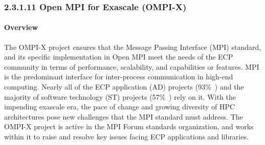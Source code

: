 \subsubsection{2.3.1.11 Open MPI for Exascale (OMPI-X)}\label{subsubsect:openmpi}



\paragraph{Overview}

The OMPI-X project ensures that the Message Passing Interface (MPI)
standard, and its specific implementation in Open MPI meet the needs
of the ECP community in terms of performance, scalability, and
capabilities or features. MPI is the predominant interface for
inter-process communication in high-end computing.  Nearly all of the
ECP application (AD) projects (93\%~\cite{Bernholdt:2017:smu-talk})
and the majority of software technology (ST) projects
(57\%~\cite{Bernholdt:2017:smu-talk}) rely on it.
With the impending exascale era, the
pace of change and growing diversity of HPC architectures pose new
challenges that the MPI standard must address.  The OMPI-X project is
active in the MPI Forum standards organization, and works within it to
raise and resolve key issues facing ECP applications and libraries.

